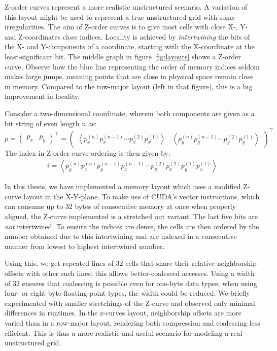 Z-order curves \cite{wiki:z-curves} represent a more realistic unstructured scenario. A variation of this layout might be used to represent a true unstructured grid with some irregularities. The aim of Z-order curves is to give most cells with close X-, Y- and Z-coordinates close indices. Locality is achieved by \emph{intertwining} the bits of the X- and Y-components of a coordinate, starting with the X-coordinate at the least-significant bit. The middle graph in figure \ref{fig:layouts} shows a Z-order curve. Observe how the blue line representing the order of memory indices seldom makes large jumps, meaning points that are close in physical space remain close in memory. Compared to the row-major layout (left in that figure), this is a big improvement in locality.

Consider a two-dimensional coordinate, wherein both components are given as a bit string of even length $n$ as:
$$p=\begin{pmatrix}p_x & p_y\end{pmatrix}^\top=\begin{pmatrix}\left\langle p_x^{(n)} p_x^{(n-1)} \cdots p_x^{(2)} p_x^{(1)} \right\rangle & \left\langle p_y^{(n)} p_y^{(n-1)} \cdots p_y^{(2)} p_y^{(1)} \right\rangle\end{pmatrix}^\top$$
The index in Z-order curve ordering is then given by:
\begin{gather}
    i = \left\langle p_y^{(n)} p_x^{(n)} p_y^{(n-1)} p_x^{(n-1)} \cdots p_y^{(2)} p_x^{(2)} p_y^{(1)} p_x^{(1)}\right\rangle
\end{gather}

In this thesis, we have implemented a memory layout which uses a modified Z-curve layout in the X-Y-plane. To make use of CUDA's vector instructions, which can consume up to 32 bytes of consecutive memory at once when properly aligned, the Z-curve implemented is a stretched out variant. The last five bits are \emph{not} intertwined. To ensure the indices are dense, the cells are then ordered by the number obtained due to this intertwining and are indexed in a consecutive manner from lowest to highest intertwined number.

Using this, we get repeated lines of 32 cells that share their relative neighborship offsets with other such lines; this allows better-coalesced accesses. Using a width of 32 ensures that coalescing is possible even for one-byte data types; when using four- or eight-byte floating-point types, the width could be reduced. We briefly experimented with smaller stretchings of the Z-curve and observed only minimal differences in runtimes. In the z-curves layout, neighborship offsets are more varied than in a row-major layout, rendering both compression and coalescing less efficient. This is thus a more realistic and useful scenario for modeling a real unstructured grid.

